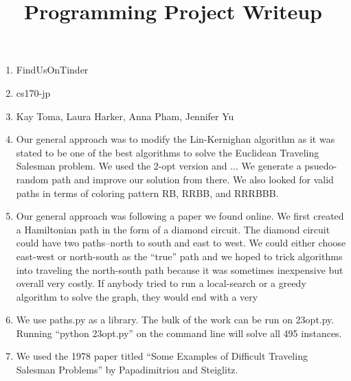 \documentclass{article}
\begin{document}
\title{Programming Project Writeup}

\maketitle

\begin{enumerate}
\item FindUsOnTinder
\item cs170-jp
\item Kay Toma, Laura Harker, Anna Pham, Jennifer Yu
\item Our general approach was to modify the Lin-Kernighan algorithm as it was stated to be one of the best algorithms to solve the Euclidean Traveling Salesman problem. We used the 2-opt version and ... We generate a psuedo-random path and improve our solution from there. We also looked for valid paths in terms of coloring pattern RB, RRBB, and RRRBBB. 
\item Our general approach was following a paper we found online. We first created a Hamiltonian path in the form of a diamond circuit. The diamond circuit could have two paths--north to south and east to west. We could either choose east-west or north-south as the ``true'' path and we hoped to trick algorithms into traveling the north-south path because it was sometimes inexpensive but overall very costly. If anybody tried to run a local-search or a greedy algorithm to solve the graph, they would end with a very 
\item We use paths.py as a library. The bulk of the work can be run on 23opt.py. Running ``python 23opt.py'' on the command line will solve all 495 instances. 
\item We used the 1978 paper titled ``Some Examples of Difficult Traveling Salesman Problems'' by Papadimitriou and Steiglitz. 
\end{enumerate}
\end{document}
